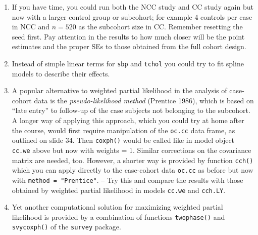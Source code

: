 \begin{enumerate}[resume]

\item
If you have time, you could run both the NCC study and CC study 
again but now with a larger control group or subcohort;
for example 4 controls per case in NCC and $n=520$ as the subcohort size in CC. Remember resetting the seed first. 
Pay attention in the results to how much closer 
will be the point estimates and the proper SEs to those
obtained from the full cohort design. 
\item
Instead of simple linear terms for {\tt sbp} and {\tt tchol} you could try to fit
spline models to describe their effects.
\item
A popular alternative to weighted partial likelihood
in the analysis of case-cohort data is the {\it pseudo-likelihood method}
(Prentice 1986), which is based on ``late entry'' to follow-up 
of the case subjects not belonging to 
the subcohort. A longer way of applying this
approach, which you could try at home after the course,
 would first require manipulation of the {\tt oc.cc} data frame,
as outlined on slide 34. Then  {\tt coxph()} would be 
called like in model object {\tt cc.we} above 
but now with weights = 1. Similar corrections
 on the covariance matrix are needed, too.
However, a shorter way is provided by function {\tt cch()} which
you can apply directly to the case-cohort data {\tt oc.cc} as before
but now with {\tt method = "Prentice"}. -- Try this and compare the results
with those obtained by weighted partial likelihood in models
{\tt cc.we} and  {\tt cch.LY}. 
\item
Yet another computational solution for
maximizing weighted partial likelihood is provided by 
a combination of functions {\tt twophase()} 
 and {\tt svycoxph()} of the {\tt survey} package.
\begin{comment}
In this approach, the starting point is a data frame, 
named e.g. {\tt oc.lex2},
that contains the whole cohort but includes also 
necessary columns for the interesting risk factors, such that
their values are known for the cases and the subcohort members
but are missing ({\tt NA}) for non-cases outside the subcohort.
The case-cohort design embedded in the cohort 
is viewed as a special case of a {\it two-phase sampling design}.
The pertinent design features are determined by
the key indicator variables in {\tt oc.lex2}: 
subcohort membership (cf. variable {\tt subcind} above)
and case status ({\tt chdeath}). 
Based on these items, 

\end{comment}
\end{enumerate}

